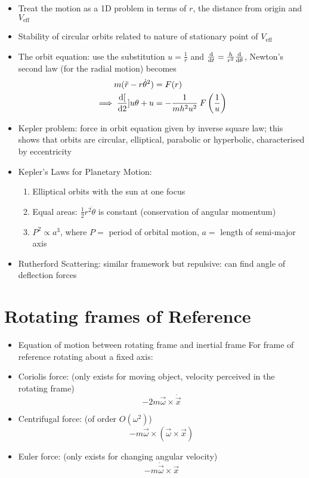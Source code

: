 \begin{itemize}
      \item Treat the motion as a 1D problem in terms of $r$, the distance from origin and $V_{\textrm{eff}}$
      \item Stability of circular orbits related to nature of stationary point of $V_{\textrm{eff}}$
      \item The orbit equation: use the substitution $u = \frac{1}{r}$ and $ \frac{\mathrm{d}}{\mathrm{d}{t}} = \frac{h}{r^2}\frac{\mathrm{d}}{\mathrm{d}{\theta}}$, Newton's second law (for the radial motion) becomes
            \begin{align*}
                  m(\ddot{r} - r \dot{\theta}^2) & = F(r)                                                \\
                  \implies
                  \frac{\mathrm{d}{[}}{\mathrm{d}{2}}]{u}{\theta} + u         & = -\frac{1}{mh^2 u^2} \: F \left( \frac{1}{u} \right)
            \end{align*}
      \item Kepler problem: force in orbit equation given by inverse square law; this shows that orbits are circular, elliptical, parabolic or hyperbolic, characterised by eccentricity
      \item Kepler's Laws for Planetary Motion:
            \begin{enumerate}
                  \item Elliptical orbits with the sun at one focus
                  \item Equal areas: $\frac{1}{2}r^2 \dot{\theta}$ is constant (conservation of angular momentum)
                  \item $ P^2 \propto a^3$, where $P =$ period of orbital motion, $a =$ length of semi-major axis
            \end{enumerate}
      \item Rutherford Scattering: similar framework but repulsive: can find angle of deflection forces
\end{itemize}

\section{Rotating frames of Reference}
\begin{itemize}
      \item Equation of motion between rotating frame and inertial frame
            For frame of reference rotating about a fixed axis:
      \item Coriolis force: (only exists for moving object, velocity perceived in the rotating frame)
            \[-2m \vec{\omega} \times \dot{\vec{x}} \]
      \item Centrifugal force: (of order $O(\omega^2)$)
            \[-m \vec{\omega}\times (\vec{\omega} \times \vec{x}) \]
      \item Euler force: (only exists for changing angular velocity) \[-m \dot{\vec{\omega}} \times \vec{x}\]
\end{itemize}

